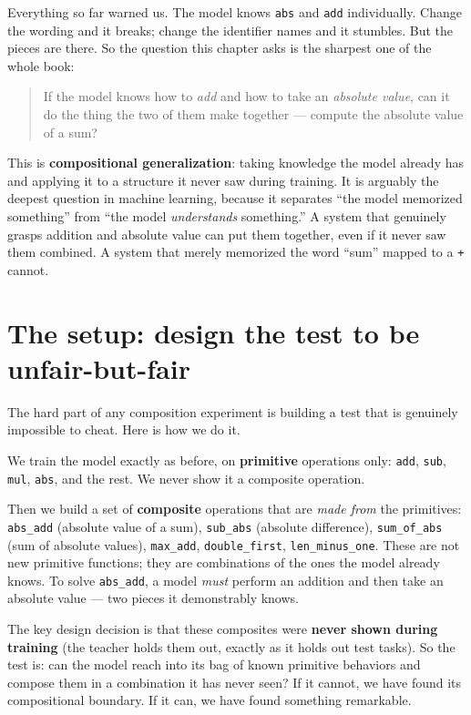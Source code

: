 Everything so far warned us. The model knows \texttt{abs} and
\texttt{add} individually. Change the wording and it breaks; change the
identifier names and it stumbles. But the pieces are there. So the
question this chapter asks is the sharpest one of the whole book:

\begin{quote}
If the model knows how to \emph{add} and how to take an \emph{absolute
value}, can it do the thing the two of them make together --- compute
the absolute value of a sum?
\end{quote}

This is \textbf{compositional generalization}: taking knowledge the
model already has and applying it to a structure it never saw during
training. It is arguably the deepest question in machine learning,
because it separates ``the model memorized something'' from ``the model
\emph{understands} something.'' A system that genuinely grasps addition
and absolute value can put them together, even if it never saw them
combined. A system that merely memorized the word ``sum'' mapped to a
\texttt{+} cannot.

\section{The setup: design the test to be
unfair-but-fair}\label{the-setup-design-the-test-to-be-unfair-but-fair}

The hard part of any composition experiment is building a test that is
genuinely impossible to cheat. Here is how we do it.

We train the model exactly as before, on \textbf{primitive} operations
only: \texttt{add}, \texttt{sub}, \texttt{mul}, \texttt{abs}, and the
rest. We never show it a composite operation.

Then we build a set of \textbf{composite} operations that are \emph{made
from} the primitives: \texttt{abs\_add} (absolute value of a sum),
\texttt{sub\_abs} (absolute difference), \texttt{sum\_of\_abs} (sum of
absolute values), \texttt{max\_add}, \texttt{double\_first},
\texttt{len\_minus\_one}. These are not new primitive functions; they
are combinations of the ones the model already knows. To solve
\texttt{abs\_add}, a model \emph{must} perform an addition and then take
an absolute value --- two pieces it demonstrably knows.

The key design decision is that these composites were \textbf{never
shown during training} (the teacher holds them out, exactly as it holds
out test tasks). So the test is: can the model reach into its bag of
known primitive behaviors and compose them in a combination it has never
seen? If it cannot, we have found its compositional boundary. If it can,
we have found something remarkable.

